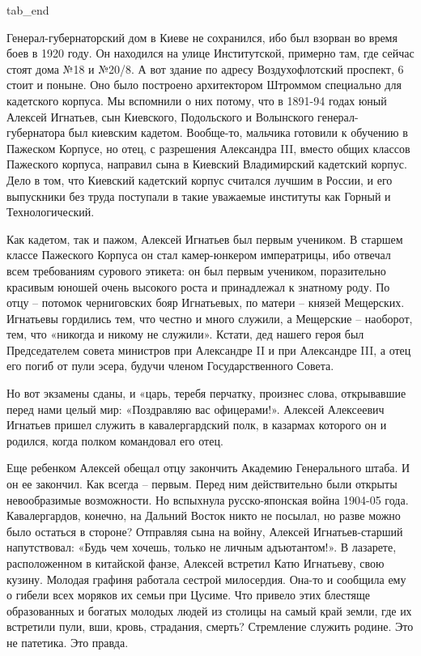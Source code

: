   tab_end
\fi


Генерал-губернаторский дом в Киеве не сохранился, ибо был взорван во время боев
в 1920 году. Он находился на улице Институтской, примерно там, где сейчас стоят
дома №18 и №20/8. А вот здание по адресу Воздухофлотский проспект, 6 стоит и
поныне. Оно было построено архитектором Штроммом специально для кадетского
корпуса. Мы вспомнили о них потому, что в 1891-94 годах юный Алексей Игнатьев,
сын Киевского, Подольского и Волынского генерал-губернатора был киевским
кадетом. Вообще-то, мальчика готовили к обучению в Пажеском Корпусе, но отец, с
разрешения Александра III, вместо общих классов Пажеского корпуса, направил
сына в Киевский Владимирский кадетский корпус. Дело в том, что Киевский
кадетский корпус считался лучшим в России, и его выпускники без труда поступали
в такие уважаемые институты как Горный и Технологический. 

Как кадетом, так и пажом, Алексей Игнатьев был первым учеником. В старшем
классе Пажеского Корпуса он стал камер-юнкером императрицы, ибо отвечал всем
требованиям сурового этикета: он был первым учеником, поразительно красивым
юношей очень высокого роста и принадлежал к знатному роду. По отцу – потомок
черниговских бояр Игнатьевых, по матери – князей Мещерских. Игнатьевы гордились
тем, что честно и много служили, а Мещерские – наоборот, тем, что «никогда и
никому не служили». Кстати, дед нашего героя был Председателем совета министров
при Александре II и при Александре III, а отец его погиб от пули эсера, будучи
членом Государственного Совета. 


Но вот экзамены сданы, и «царь, теребя перчатку, произнес слова, открывавшие
перед нами целый мир: «Поздравляю вас офицерами!». Алексей Алексеевич Игнатьев
пришел служить в кавалергардский полк, в казармах которого он и родился, когда
полком командовал его отец.  


Еще ребенком Алексей обещал отцу закончить Академию Генерального штаба. И он ее
закончил. Как всегда – первым. Перед ним действительно были открыты
невообразимые возможности. Но вспыхнула русско-японская война 1904-05 года.
Кавалергардов, конечно, на Дальний Восток никто не посылал, но разве можно было
остаться в стороне? Отправляя сына на войну, Алексей Игнатьев-старший
напутствовал: «Будь чем хочешь, только не личным адъютантом!». В лазарете,
расположенном в китайской фанзе, Алексей встретил Катю Игнатьеву, свою кузину.
Молодая графиня работала сестрой милосердия. Она-то и сообщила ему о гибели
всех моряков их семьи при Цусиме. Что привело этих блестяще образованных и
богатых молодых людей из столицы на самый край земли, где их встретили пули,
вши, кровь, страдания, смерть? Стремление служить родине. Это не патетика. Это
правда.    

